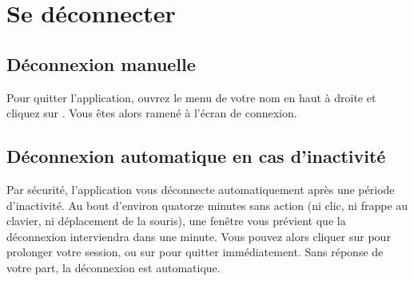 \section{Se déconnecter}

\subsection{Déconnexion manuelle}

Pour quitter l'application, ouvrez le menu de votre nom en haut à droite et cliquez sur . Vous êtes alors ramené à l'écran de connexion.

\subsection{Déconnexion automatique en cas d'inactivité}

Par sécurité, l'application vous déconnecte automatiquement après une période d'inactivité. Au bout d'environ quatorze minutes sans action (ni clic, ni frappe au clavier, ni déplacement de la souris), une fenêtre  vous prévient que la déconnexion interviendra dans une minute. Vous pouvez alors cliquer sur  pour prolonger votre session, ou sur  pour quitter immédiatement. Sans réponse de votre part, la déconnexion est automatique.


